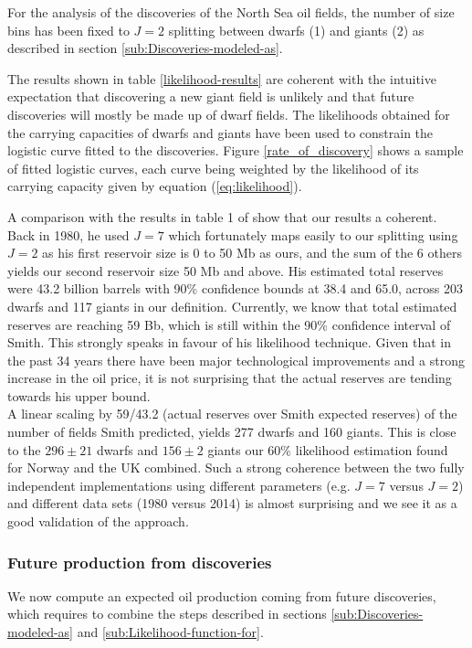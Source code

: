 \documentclass[review]{elsarticle}
\begin{document}
For the analysis of the discoveries of the North Sea oil fields, the number
of size bins has been fixed to $J=2$ splitting between dwarfs (1)
and giants (2) as described in section \ref{sub:Discoveries-modeled-as}.

The results shown in table \ref{likelihood-results} are coherent
with the intuitive expectation that discovering a new giant field
is unlikely and that future discoveries will mostly be made up of dwarf
fields. The likelihoods obtained for the carrying capacities of dwarfs
and giants have been used to constrain the logistic curve fitted to
the discoveries. Figure \ref{rate_of_discovery} shows a sample of
fitted logistic curves, each curve being weighted by the likelihood
of its carrying capacity given by equation (\ref{eq:likelihood}).

A comparison with the results in table 1 of \cite{Smith1980} show that our results a coherent. Back in 1980, he used $J=7$ which fortunately maps easily to our splitting using $J=2$ as his first reservoir size is 0 to 50 Mb as ours, and the sum of the 6 others yields our second reservoir size 50 Mb and above. His estimated total reserves were 43.2 billion barrels with 90\% confidence bounds at 38.4 and 65.0, across 203 dwarfs and 117 giants in our definition. Currently, we know that total estimated reserves are reaching 59 Bb, which is still within the 90\% confidence interval of Smith. This strongly speaks in favour of his likelihood technique. Given that in the past 34 years there have been major technological improvements and a strong increase in the oil price, it is not surprising that the actual reserves are tending towards his upper bound.\\
A linear scaling by 59/43.2 (actual reserves over Smith expected reserves) of the number of fields Smith predicted, yields 277 dwarfs and 160 giants. This is close to the $296 \pm 21$ dwarfs and $156 \pm 2$ giants our 60\% likelihood estimation found for Norway and the UK combined. Such a strong coherence between the two fully independent implementations using different parameters (e.g. $J=7$ versus $J=2$) and different data sets (1980 versus 2014) is almost surprising and we see it as a good validation of the approach.


\subsubsection{Future production from discoveries\label{sub:Future-production-from}}

We now compute an expected oil production coming from future
discoveries, which requires to combine the steps described in sections
\ref{sub:Discoveries-modeled-as} and \ref{sub:Likelihood-function-for}.
\end{document}

